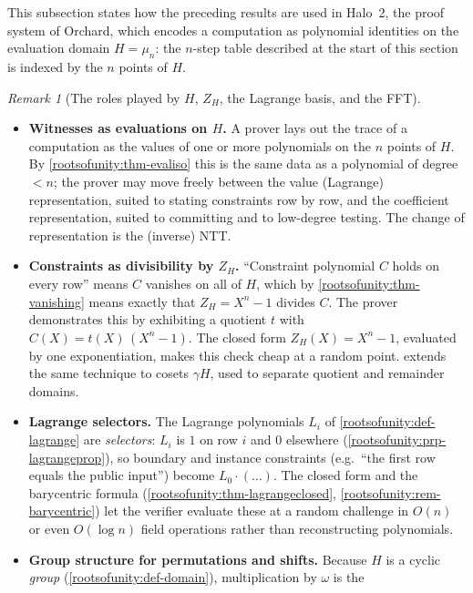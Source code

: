 \documentclass[11pt,a4paper]{article}
\theoremstyle{definition}
\theoremstyle{remark}
\newtheorem{remark}[theorem]{Remark}
\begin{document}
This subsection states how the preceding results are used in Halo~2,
the proof system of Orchard, which encodes a computation as polynomial
identities on the evaluation domain \(H = \mu_n\): the \(n\)-step table
described at the start of this section is indexed by the \(n\) points of
\(H\).

\begin{remark}[The roles played by \(H\), \(Z_H\), the Lagrange basis,
and the FFT]\label{rootsofunity:rem-whyproofsystems}
\leavevmode
\begin{itemize}
\item \textbf{Witnesses as evaluations on \(H\).} A prover lays out the
  trace of a computation as the values of one or more polynomials on
  the \(n\) points of \(H\). By \cref{rootsofunity:thm-evaliso} this is
  the same data as a polynomial of degree \(< n\); the prover may move
  freely between the value (Lagrange) representation, suited to
  stating constraints row by row, and the coefficient representation,
  suited to committing and to low-degree testing. The change of
  representation is the (inverse) NTT.
\item \textbf{Constraints as divisibility by \(Z_H\).} ``Constraint
  polynomial \(C\) holds on every row'' means \(C\) vanishes on all of
  \(H\), which by \cref{rootsofunity:thm-vanishing} means exactly that
  \(Z_H = X^n - 1\) divides \(C\). The prover demonstrates this by
  exhibiting a quotient \(t\) with \(C(X) = t(X)\,(X^n - 1)\). The
  closed form \(Z_H(X) = X^n - 1\), evaluated by one exponentiation,
  makes this check cheap at a random point.
   extends the same technique to cosets
  \(\gamma H\), used to separate quotient and remainder domains.
\item \textbf{Lagrange selectors.} The Lagrange polynomials \(L_i\) of
  \cref{rootsofunity:def-lagrange} are \emph{selectors}: \(L_i\) is
  \(1\) on row \(i\) and \(0\) elsewhere
  (\cref{rootsofunity:prp-lagrangeprop}), so boundary and instance
  constraints (e.g.\ ``the first row equals the public input'') become
  \(L_0 \cdot (\dots)\). The closed form and the barycentric formula
  (\cref{rootsofunity:thm-lagrangeclosed},
  \cref{rootsofunity:rem-barycentric}) let the verifier evaluate these
  at a random challenge in \(O(n)\) or even \(O(\log n)\) field
  operations rather than reconstructing polynomials.
\item \textbf{Group structure for permutations and shifts.} Because
  \(H\) is a cyclic \emph{group}
  (\cref{rootsofunity:def-domain}), multiplication by \(\omega\) is the

\end{itemize}
\end{remark}
\end{document}
